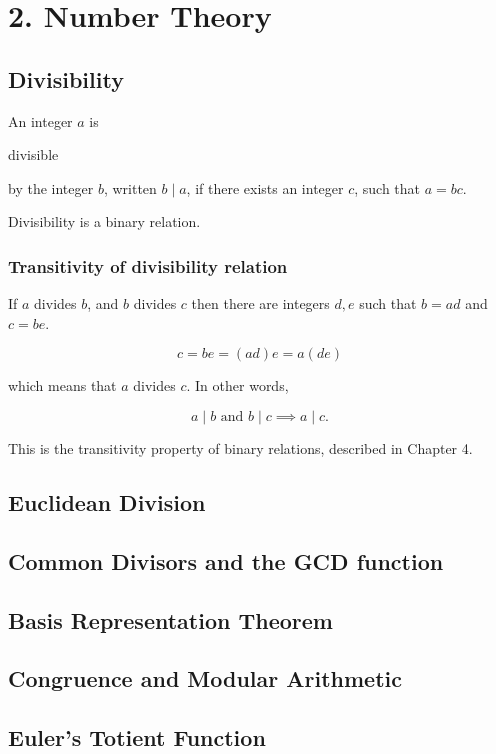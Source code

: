 \documentclass[11pt]{article}
\theoremstyle{plain}
\theoremstyle{definition}
\begin{document}
\section*{2. Number Theory}

\subsection*{Divisibility}

An integer $a$ is \begin{em}divisible\end{em} by the integer $b$, written $b \mid a$, if there exists an integer $c$, such that $ a = bc. $

Divisibility is a binary relation.

\subsubsection*{Transitivity of divisibility relation}

If $a$ divides $b$, and $b$ divides $c$ then there are integers $d, e$ such that $b = ad$ and $c = be$.

$$
  c = be = (ad)e = a(de)
$$

which means that $a$ divides $c$. In other words,

$$
  a \mid b \text{ and } b \mid c \implies a \mid c.
$$

This is the transitivity property of binary relations, described in Chapter 4.

\subsection*{Euclidean Division}

\subsection*{Common Divisors and the GCD function}

\subsection*{Basis Representation Theorem}

\subsection*{Congruence and Modular Arithmetic}

\subsection*{Euler's Totient Function}
\end{document}
